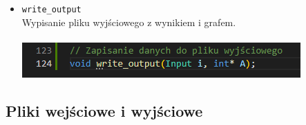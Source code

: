 \documentclass{article}
\begin{document}
\begin{itemize}
        \item \texttt{write\_output} \\
        Wypisanie pliku wyjściowego z wynikiem i grafem. \\\\
        \includegraphics[width=0.825\linewidth, center]{img/write_output.png}
        
    \end{itemize}
    
    
    
    \subsection{Pliki wejściowe i wyjściowe}
    
\end{document}
